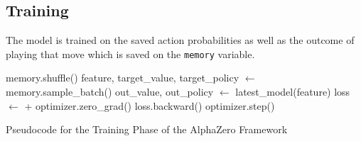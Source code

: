 \subsection{Training}

The model is trained on the saved action probabilities as well as the outcome of playing that move which is saved on the \lstinline{memory} variable. 
    
\begin{algorithm}[htb]
\begin{algorithmic}
        \State memory.shuffle()
            \State feature, target\_value, target\_policy $\gets$ memory.sample\_batch()
            \State out\_value, out\_policy $\gets$ latest\_model(feature)
            \State loss $\gets$  +
            \State optimizer.zero\_grad()
            \State loss.backward()
            \State optimizer.step()
        \EndFor
    \EndFunction
    \caption{Pseudocode for the Training Phase of the AlphaZero Framework}
    \label{alg:training_phase}
\end{algorithmic}
\end{algorithm}